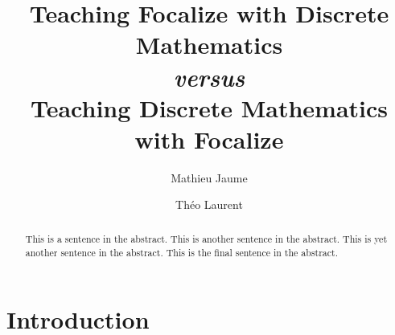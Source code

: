 \documentclass[submission,copyright,creativecommons]{eptcs}
\title{Teaching Focalize with Discrete Mathematics \\ {\it versus} \\ Teaching Discrete Mathematics with Focalize}
\author{Mathieu Jaume
\institute{LIP6 -- UPMC \\ Paris, France}
\email{Mathieu.Jaume@lip6.fr}
\and Th\'eo Laurent
\institute{UPMC \\ Paris, France} 
\email{Theo.Laurent@etu.upmc.fr}
}
\begin{document}
\maketitle

\begin{abstract}
This is a sentence in the abstract.
This is another sentence in the abstract.
This is yet another sentence in the abstract.
This is the final sentence in the abstract.
\end{abstract}

\section{Introduction}

\nocite{*}


\end{document}
